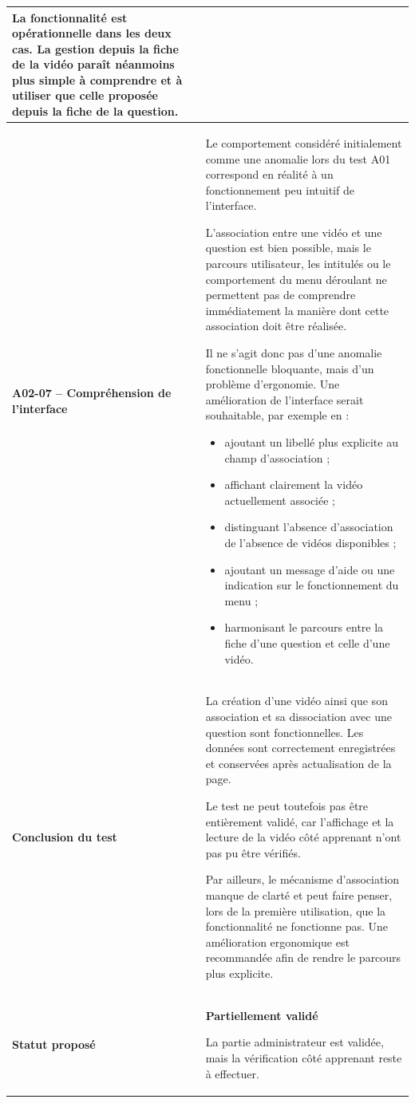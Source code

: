 \begin{longtable}{
    |>{\raggedright\arraybackslash}p{}
    |>{\raggedright\arraybackslash}p{}|
}
La fonctionnalité est opérationnelle dans les deux cas. La gestion depuis
la fiche de la vidéo paraît néanmoins plus simple à comprendre et à
utiliser que celle proposée depuis la fiche de la question.
\\
\hline

\textbf{A02-07 -- Compréhension de l'interface}
&
Le comportement considéré initialement comme une anomalie lors du test A01
correspond en réalité à un fonctionnement peu intuitif de l'interface.

L'association entre une vidéo et une question est bien possible, mais le
parcours utilisateur, les intitulés ou le comportement du menu déroulant ne
permettent pas de comprendre immédiatement la manière dont cette
association doit être réalisée.

Il ne s'agit donc pas d'une anomalie fonctionnelle bloquante, mais d'un
problème d'ergonomie. Une amélioration de l'interface serait souhaitable,
par exemple en :
\begin{itemize}[leftmargin=*,nosep]
    \item ajoutant un libellé plus explicite au champ d'association ;
    \item affichant clairement la vidéo actuellement associée ;
    \item distinguant l'absence d'association de l'absence de vidéos
    disponibles ;
    \item ajoutant un message d'aide ou une indication sur le fonctionnement
    du menu ;
    \item harmonisant le parcours entre la fiche d'une question et celle
    d'une vidéo.
\end{itemize}
\\
\hline

\textbf{Conclusion du test}
&
La création d'une vidéo ainsi que son association et sa dissociation avec
une question sont fonctionnelles. Les données sont correctement
enregistrées et conservées après actualisation de la page.

Le test ne peut toutefois pas être entièrement validé, car l'affichage et
la lecture de la vidéo côté apprenant n'ont pas pu être vérifiés.

Par ailleurs, le mécanisme d'association manque de clarté et peut faire
penser, lors de la première utilisation, que la fonctionnalité ne fonctionne
pas. Une amélioration ergonomique est recommandée afin de rendre le parcours
plus explicite.
\\
\hline

\textbf{Statut proposé}
&
\textbf{Partiellement validé}

La partie administrateur est validée, mais la vérification côté apprenant
reste à effectuer.
\\


\end{longtable}

